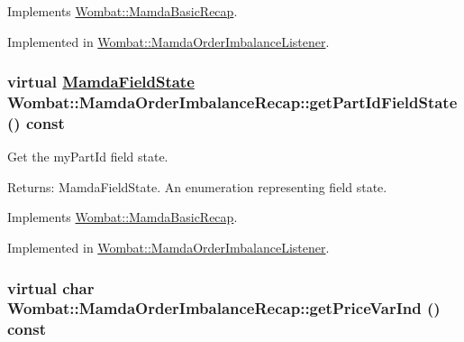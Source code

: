 Implements \hyperlink{classWombat_1_1MamdaBasicRecap_9aaa6f48d5e0bf04f98125378525241d}{Wombat::Mamda\-Basic\-Recap}.

Implemented in \hyperlink{classWombat_1_1MamdaOrderImbalanceListener_2f47719f14e5d1280791c8d832522589}{Wombat::Mamda\-Order\-Imbalance\-Listener}.\hypertarget{classWombat_1_1MamdaOrderImbalanceRecap_841fcf0b983e68acb4da8b3aad428d47}{
\subsubsection[getPartIdFieldState]{\setlength{\rightskip}{0pt plus 5cm}virtual \hyperlink{namespaceWombat_93aac974f2ab713554fd12a1fa3b7d2a}{Mamda\-Field\-State} Wombat::Mamda\-Order\-Imbalance\-Recap::get\-Part\-Id\-Field\-State () const}}
\label{classWombat_1_1MamdaOrderImbalanceRecap_841fcf0b983e68acb4da8b3aad428d47}


Get the my\-Part\-Id field state. 

\begin{Desc}
\item[Returns:]Mamda\-Field\-State. An enumeration representing field state. \end{Desc}


Implements \hyperlink{classWombat_1_1MamdaBasicRecap_97e4612d57ce6387e6414b00b201e242}{Wombat::Mamda\-Basic\-Recap}.

Implemented in \hyperlink{classWombat_1_1MamdaOrderImbalanceListener_d8f5442d6f66c8a21c32581c66033146}{Wombat::Mamda\-Order\-Imbalance\-Listener}.\hypertarget{classWombat_1_1MamdaOrderImbalanceRecap_3aa9b6bbac27f9e29b8a1b9b43b11258}{
\subsubsection[getPriceVarInd]{\setlength{\rightskip}{0pt plus 5cm}virtual char Wombat::Mamda\-Order\-Imbalance\-Recap::get\-Price\-Var\-Ind () const}}
\label{classWombat_1_1MamdaOrderImbalanceRecap_3aa9b6bbac27f9e29b8a1b9b43b11258}


